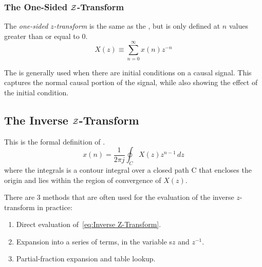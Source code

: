 \subsubsection{The One-Sided \texorpdfstring{$\operatorname{\mathcal{Z}}$-Transform}{Z-Transform}}\label{subsubsec:One-Sided Z-Transform}
\begin{definition}\label{def:One-Sided Z-Transform}
  The \emph{one-sided $z$-transform} is the same as the , but is only defined at $n$ values greater than or equal to 0.
  \begin{equation}\label{eq:One-Sided Z-Transform}
    X(z) \equiv \sum_{n=0}^{\infty} x(n)z^{-n}
  \end{equation}
\end{definition}

The  is generally used when there are initial conditions on a causal signal.
This captures the normal causal portion of the signal, while also showing the effect of the initial condition.

\subsection{The Inverse \texorpdfstring{$\operatorname{\mathcal{Z}}$-Transform}{Z-Transform}}\label{subsec:Inverse Z-Transform}
This is the formal definition of .
\begin{equation}\label{eq:Inverse Z-Transform}
  x(n) = \frac{1}{2 \pi j} \oint_{C} X(z) z^{n-1} \, dz
\end{equation}
where the integrals is a contour integral over a closed path C that encloses the origin and lies within the region of convergence of $X(z)$.

There are 3 methods that are often used for the evaluation of the inverse $z$-transform in practice:
\begin{enumerate}[noitemsep]
\item Direct evaluation of~\eqref{eq:Inverse Z-Transform}.
\item Expansion into a series of terms, in the variable s$z$ and $z^{-1}$.
\item Partial-fraction expansion and table lookup.
\end{enumerate}

